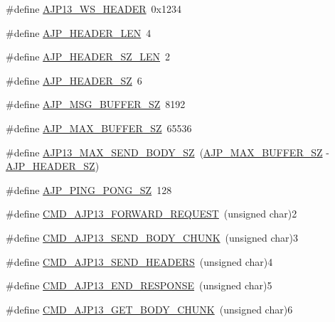 \begin{DoxyCompactItemize}
\item 
\#define \hyperlink{group__AJP__defines_gabf28eafa4ce874f380825faefa8367bd}{A\+J\+P13\+\_\+\+W\+S\+\_\+\+H\+E\+A\+D\+ER}~0x1234
\item 
\#define \hyperlink{group__AJP__defines_ga46f6439c978873cb76944ae66a5c2e4d}{A\+J\+P\+\_\+\+H\+E\+A\+D\+E\+R\+\_\+\+L\+EN}~4
\item 
\#define \hyperlink{group__AJP__defines_ga225d746db3cd8b8c8f6f3025b5b89d34}{A\+J\+P\+\_\+\+H\+E\+A\+D\+E\+R\+\_\+\+S\+Z\+\_\+\+L\+EN}~2
\item 
\#define \hyperlink{group__AJP__defines_ga5b22fc3856c3296496cdbaecee7ba3f2}{A\+J\+P\+\_\+\+H\+E\+A\+D\+E\+R\+\_\+\+SZ}~6
\item 
\#define \hyperlink{group__AJP__defines_ga93967d385d31511aa99b1ecd9cb5a6f4}{A\+J\+P\+\_\+\+M\+S\+G\+\_\+\+B\+U\+F\+F\+E\+R\+\_\+\+SZ}~8192
\item 
\#define \hyperlink{group__AJP__defines_ga2b69f77389d86becb47b89bd0d7e6951}{A\+J\+P\+\_\+\+M\+A\+X\+\_\+\+B\+U\+F\+F\+E\+R\+\_\+\+SZ}~65536
\item 
\#define \hyperlink{group__AJP__defines_ga5b50a04c0ddd3f5c5c248691ede9185e}{A\+J\+P13\+\_\+\+M\+A\+X\+\_\+\+S\+E\+N\+D\+\_\+\+B\+O\+D\+Y\+\_\+\+SZ}~(\hyperlink{group__AJP__defines_ga2b69f77389d86becb47b89bd0d7e6951}{A\+J\+P\+\_\+\+M\+A\+X\+\_\+\+B\+U\+F\+F\+E\+R\+\_\+\+SZ} -\/ \hyperlink{group__AJP__defines_ga5b22fc3856c3296496cdbaecee7ba3f2}{A\+J\+P\+\_\+\+H\+E\+A\+D\+E\+R\+\_\+\+SZ})
\item 
\#define \hyperlink{group__AJP__defines_gac102207d38f550353325f06ff0b67d8d}{A\+J\+P\+\_\+\+P\+I\+N\+G\+\_\+\+P\+O\+N\+G\+\_\+\+SZ}~128
\item 
\#define \hyperlink{group__AJP__defines_gad8a84ab45f2721c2154ebbc32666ea01}{C\+M\+D\+\_\+\+A\+J\+P13\+\_\+\+F\+O\+R\+W\+A\+R\+D\+\_\+\+R\+E\+Q\+U\+E\+ST}~(unsigned char)2
\item 
\#define \hyperlink{group__AJP__defines_gae695e3792e42b459b5dc01f52267dd87}{C\+M\+D\+\_\+\+A\+J\+P13\+\_\+\+S\+E\+N\+D\+\_\+\+B\+O\+D\+Y\+\_\+\+C\+H\+U\+NK}~(unsigned char)3
\item 
\#define \hyperlink{group__AJP__defines_ga67e4cfae5446500664ab262bab1f235b}{C\+M\+D\+\_\+\+A\+J\+P13\+\_\+\+S\+E\+N\+D\+\_\+\+H\+E\+A\+D\+E\+RS}~(unsigned char)4
\item 
\#define \hyperlink{group__AJP__defines_ga80bf9e807c6ccb6b211671d9057a0249}{C\+M\+D\+\_\+\+A\+J\+P13\+\_\+\+E\+N\+D\+\_\+\+R\+E\+S\+P\+O\+N\+SE}~(unsigned char)5
\item 
\#define \hyperlink{group__AJP__defines_ga4a011bf235b6b855f22ae36791f92dcf}{C\+M\+D\+\_\+\+A\+J\+P13\+\_\+\+G\+E\+T\+\_\+\+B\+O\+D\+Y\+\_\+\+C\+H\+U\+NK}~(unsigned char)6

\end{DoxyCompactItemize}
